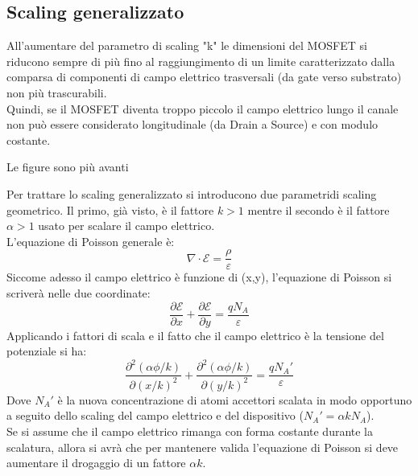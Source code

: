 \subsection{Scaling generalizzato}
All'aumentare del parametro di scaling "k" le dimensioni del MOSFET si riducono sempre di più fino al raggiungimento di un limite caratterizzato dalla comparsa di componenti di campo elettrico trasversali (da gate verso substrato) non più trascurabili.\\
Quindi, se il MOSFET diventa troppo piccolo il campo elettrico lungo il canale non può essere considerato longitudinale (da Drain a Source) e con modulo costante.\\
\begin{exbox}
    Le figure sono più avanti
\end{exbox}

Per trattare lo scaling generalizzato si introducono due parametridi scaling geometrico. Il primo, già visto, è il fattore $k>1$ mentre il secondo è il fattore $\alpha >1$ usato per scalare il campo elettrico.\\

L'equazione di Poisson generale è:
%
\begin{equation}
    \nabla\cdot\mathcal{E}=\dfrac{\rho}{\varepsilon}
\end{equation}
Siccome adesso il campo elettrico  è funzione di (x,y), l'equazione di Poisson si scriverà nelle due coordinate:
%
\begin{equation}
    \dfrac{\partial\mathcal{E}}{\partial x} + \dfrac{\partial\mathcal{E}}{\partial y} = \dfrac{q N_A}{\varepsilon}
\end{equation}
%
Applicando i fattori di scala e il fatto che il campo elettrico è la tensione del potenziale si ha:
%
\begin{equation}
    \dfrac{\partial^2 (\alpha \phi/k)}{\partial (x/k)^2} + \dfrac{\partial^2 (\alpha \phi/k)}{\partial (y/k)^2}=\dfrac{qN_A'}{\varepsilon}
\end{equation}
%
Dove $N_A'$ è la nuova concentrazione di atomi accettori scalata in modo opportuno a seguito dello scaling del campo elettrico e del dispositivo ($N_A'=\alpha k N_A$).\\
Se si assume che il campo elettrico rimanga con forma costante durante la scalatura, allora si avrà che per mantenere valida l'equazione di Poisson si deve aumentare il drogaggio di un fattore $\alpha k$.\\

